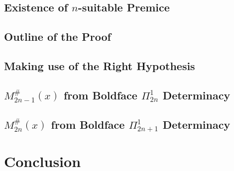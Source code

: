 \documentclass[11pt]{amsart}
\newcounter{cl}[satz]
\numberwithin{subsection}{section}
\theoremstyle{definition}
\theoremstyle{remark}
\begin{document}


\subsection{Existence of $n$-suitable Premice}
\label{sec:prep}



\subsection{Outline of the Proof}
\label{sec:outline}



\subsection{Making use of the Right Hypothesis}
\label{sec:assumption}



\subsection{$M_{2n-1}^\#(x)$ from Boldface $\Pi^1_{2n}$ Determinacy} 
\label{sec:odd}



\subsection{$M_{2n}^\#(x)$ from Boldface $\Pi^1_{2n+1}$ Determinacy} 
\label{sec:even}




\section{Conclusion}
\label{ch:conclusion}





 
\nocite{*}
\end{document}
